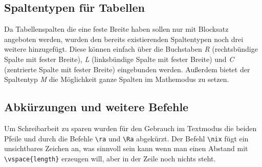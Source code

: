 \documentclass{myReport}
\begin{document}
\subsection{Spaltentypen für Tabellen}

Da Tabellenspalten die eine feste Breite haben sollen nur mit Blocksatz angeboten werden, wurden den bereits existierenden Spaltentypen noch drei weitere hinzugefügt. Diese können einfach über die Buchstaben \emph{R} (rechtsbündige Spalte mit fester Breite), \emph{L} (linksbündige Spalte mit fester Breite) und \emph{C} (zentrierte Spalte mit fester Breite) eingebunden werden. Außerdem bietet der Spaltentyp \emph{M} die Möglichkeit ganze Spalten im Mathemodus zu setzen.

\subsection{Abkürzungen und weitere Befehle}

Um Schreibarbeit zu sparen wurden für den Gebrauch im Textmodus die beiden Pfeile \ra und \Ra durch die Befehle \lstinline|\ra| und \lstinline|\Ra| abgekürzt. Der Befehl \lstinline|\nix| fügt ein unsichtbares Zeichen an, was sinnvoll sein kann wenn man einen Abstand mit \lstinline|\vspace{length}| erzeugen will, aber in der Zeile noch nichts steht.
\end{document}
